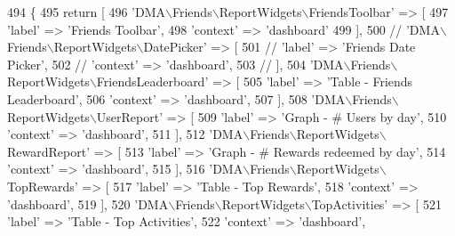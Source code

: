 \begin{DoxyCode}
494     \{   
495         \textcolor{keywordflow}{return} [
496             \textcolor{stringliteral}{'DMA\(\backslash\)Friends\(\backslash\)ReportWidgets\(\backslash\)FriendsToolbar'} => [
497                 \textcolor{stringliteral}{'label'}     => \textcolor{stringliteral}{'Friends Toolbar'},
498                 \textcolor{stringliteral}{'context'}   => \textcolor{stringliteral}{'dashboard'}
499             ],
500             \textcolor{comment}{// 'DMA\(\backslash\)Friends\(\backslash\)ReportWidgets\(\backslash\)DatePicker' => [}
501             \textcolor{comment}{//     'label'     => 'Friends Date Picker',}
502             \textcolor{comment}{//     'context'   => 'dashboard',}
503             \textcolor{comment}{// ],}
504             \textcolor{stringliteral}{'DMA\(\backslash\)Friends\(\backslash\)ReportWidgets\(\backslash\)FriendsLeaderboard'} => [
505                 \textcolor{stringliteral}{'label'}     => \textcolor{stringliteral}{'Table - Friends Leaderboard'},
506                 \textcolor{stringliteral}{'context'}   => \textcolor{stringliteral}{'dashboard'},
507             ],
508             \textcolor{stringliteral}{'DMA\(\backslash\)Friends\(\backslash\)ReportWidgets\(\backslash\)UserReport'} => [
509                 \textcolor{stringliteral}{'label'}     => \textcolor{stringliteral}{'Graph - # Users by day'},
510                 \textcolor{stringliteral}{'context'}   => \textcolor{stringliteral}{'dashboard'},
511             ],
512             \textcolor{stringliteral}{'DMA\(\backslash\)Friends\(\backslash\)ReportWidgets\(\backslash\)RewardReport'} => [
513                 \textcolor{stringliteral}{'label'}     => \textcolor{stringliteral}{'Graph - # Rewards redeemed by day'},
514                 \textcolor{stringliteral}{'context'}   => \textcolor{stringliteral}{'dashboard'},
515             ],
516             \textcolor{stringliteral}{'DMA\(\backslash\)Friends\(\backslash\)ReportWidgets\(\backslash\)TopRewards'} => [
517                 \textcolor{stringliteral}{'label'}     => \textcolor{stringliteral}{'Table - Top Rewards'},
518                 \textcolor{stringliteral}{'context'}   => \textcolor{stringliteral}{'dashboard'},
519             ],
520             \textcolor{stringliteral}{'DMA\(\backslash\)Friends\(\backslash\)ReportWidgets\(\backslash\)TopActivities'} => [
521                 \textcolor{stringliteral}{'label'}     => \textcolor{stringliteral}{'Table - Top Activities'},
522                 \textcolor{stringliteral}{'context'}   => \textcolor{stringliteral}{'dashboard'},

\end{DoxyCode}
